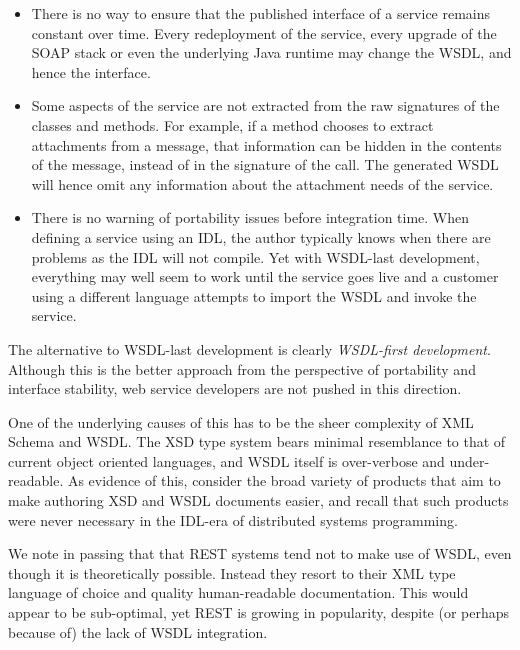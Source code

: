 \begin{itemize}

\item
    
There is no way to ensure that the published interface of a service
remains constant over time. Every redeployment of the service, every
upgrade of the SOAP stack or even the underlying Java runtime may
change the WSDL, and hence the interface.

\item

Some aspects of the service are not extracted from the raw signatures
of the classes and methods. For example, if a method chooses to
extract attachments from a message, that information can be hidden in
the contents of the message, instead of in the signature of the
call. The generated WSDL will hence omit any information about the
attachment needs of the service.

\item

There is no warning of portability issues before integration time.
When defining a service using an IDL, the author typically knows when
there are problems as the IDL will not compile. Yet with WSDL-last
development, everything may well seem to work until the service goes
live and a customer using a different language attempts to import the
WSDL and invoke the service.
    
\end{itemize}

The alternative to WSDL-last development is clearly \emph{WSDL-first
development}. Although this is the better approach from the perspective
of portability and interface stability, web service developers are not
pushed in this direction.

One of the underlying causes of this has to be the sheer complexity of
XML Schema and WSDL. The XSD type system bears minimal resemblance to
that of current object oriented languages, and WSDL itself is
over-verbose and under-readable. As evidence of this, consider the
broad variety of products that aim to make authoring XSD and WSDL
documents easier, and recall that such products were never necessary
in the IDL-era of distributed systems programming.

We note in passing that that REST systems \cite{fielding:rest} tend not to
make use of WSDL, even though it is theoretically possible. Instead
they resort to their XML type language of choice and quality
human-readable documentation. This would appear to be sub-optimal, yet
REST is growing in popularity, despite (or perhaps because of) the
lack of WSDL integration.

